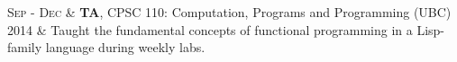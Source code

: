 \documentclass[10pt]{article}
\newcommand{\spacing}{\vspace{0.5cm}}
\begin{document}
\begin{longtable}
    \textsc{Sep - Dec}      & \textbf{TA}, CPSC 110: Computation, Programs and Programming     (UBC)                                                                                                   \\
    \vspace{0.3cm}2014      & {\small Taught the fundamental concepts of functional programming in a Lisp-family language during weekly labs.}
\end{longtable}

\spacing
\vspace{5ex}

%
\end{document}

